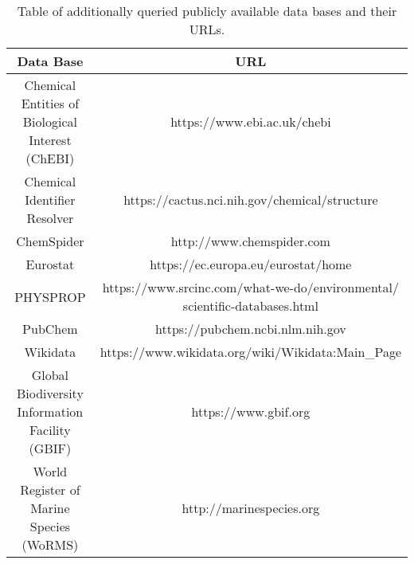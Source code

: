\begin{table}[ht]
  \caption{Table of additionally queried publicly available data bases and their URLs.}
  \label{tab:data-base-additional}
  \centering
\begin{tabular}{cc}
  \hline
  Data Base & URL \\ 
  \hline
  \makecell{Chemical Entities of \\ Biological Interest (ChEBI)} & https://www.ebi.ac.uk/chebi  \\
  Chemical Identifier Resolver & https://cactus.nci.nih.gov/chemical/structure  \\[0.5cm]
  ChemSpider & http://www.chemspider.com    \\[0.5cm]
  Eurostat & https://ec.europa.eu/eurostat/home \\[0.5cm]
  PHYSPROP & \makecell{https://www.srcinc.com/what-we-do/environmental/\\scientific-databases.html}  \\[0.5cm]
  PubChem & https://pubchem.ncbi.nlm.nih.gov \\[0.5cm]
  Wikidata & https://www.wikidata.org/wiki/Wikidata:Main_Page \\[0.5cm]
  \makecell{Global Biodiversity \\ Information Facility (GBIF)} & https://www.gbif.org \\[0.5cm]
  \makecell{World Register of \\ Marine Species (WoRMS)} & http://marinespecies.org \\
  \hline
\end{tabular}
\end{table}

